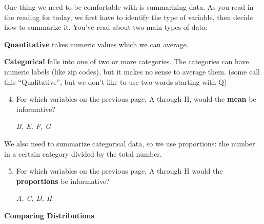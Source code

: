 \label{summry}One thing we need to be comfortable with is
  summarizing data.  As you read in the reading for today, we first
  have to identify the type of variable, then decide how to summarize it.
You've read about two main types of data:
\begin{list}{}{}
\item [\bf Quantitative] takes numeric values which we can average.
\item [\bf Categorical] falls into one of two or more categories.  The
  categories can have numeric labels (like zip codes), but it makes no
  sense to average them. (some call this ``Qualitative'', but we don't
  like to use two words starting with Q) 
\end{list}

\begin{enumerate} 
\setcounter{enumi}{3}
\item  For which variables on the previous page, A through H, would the
  {\bf mean} be informative?
\begin{students}
    \vspace{\fill}    
\end{students}

\begin{key}
  {\it B, E, F, G }
\end{key}
\end{enumerate}

   We also need to summarize categorical data, so we use proportions:
   the number in a certain category divided by the total number.

\begin{enumerate} 
\setcounter{enumi}{4}
\item  For which variables on the previous page, A through H would the
  {\bf proportions} be informative?
\begin{students}
    \vspace*{\fill}    
\end{students}

\begin{key}
  {\it A, C, D, H }
\end{key}
     
\end{enumerate}
\begin{center}
  {\bf     Comparing Distributions} \vspace{-.2in}
\end{center}

